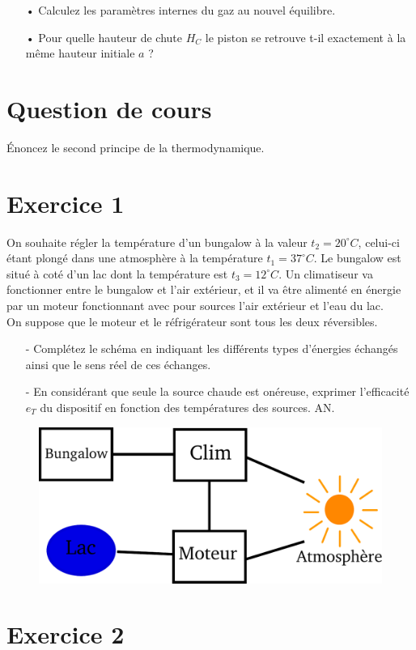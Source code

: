 \documentclass{report}
\begin{document}
\begin{itemize}
\item[•] Calculez les paramètres internes du gaz au nouvel équilibre. 
\item[•] Pour quelle hauteur de chute $H_C$ le piston se retrouve t-il exactement à la même hauteur initiale $a$ ?
\end{itemize}

\newpage
\section*{Question de cours}
Énoncez le second principe de la thermodynamique.

\section*{Exercice 1}

On souhaite régler la température d'un bungalow à la valeur $t_{2} = 20^{\circ}C$, celui-ci étant plongé dans une atmosphère à la température $t_{1}=37^{\circ}C$. Le bungalow est situé à coté d'un lac dont la température est $t_{3}=12^{\circ}C$. Un climatiseur va fonctionner entre le bungalow et l'air extérieur, et il va être alimenté en énergie par un moteur fonctionnant avec pour sources l'air extérieur et l'eau du lac.
\\
On suppose que le moteur et le réfrigérateur sont tous les deux réversibles.
\begin{itemize}
\item[-]Complétez le schéma en indiquant les différents types d'énergies échangés ainsi que le sens réel de ces échanges.
\item[-]En considérant que seule la source chaude est onéreuse, exprimer l'efficacité $e_{T}$ du dispositif en fonction des températures des sources. AN.
\end{itemize}
\begin{figure}[!h]
\centering
\includegraphics[width=0.5\linewidth]{bungalow.pdf}
\end{figure}

\section*{Exercice 2}
\end{document}
